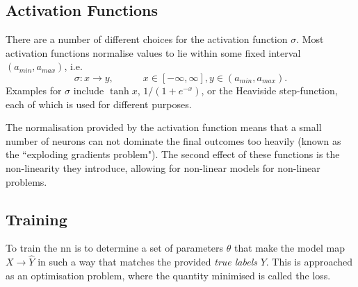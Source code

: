         
        \subsection{Activation Functions \label{ssec: activation function}}
    
        There are a number of different choices for the activation function $\sigma$. Most activation functions normalise values to lie within some fixed interval $(a_{min}, a_{max})$, i.e.
        \begin{equation}
        \sigma : x \rightarrow y, \hspace{3em} x \in [-\infty, \infty], y \in (a_{min}, a_{max}).
        \end{equation}
        Examples for $\sigma$ include $\tanh{x}$, $1/(1 + e^{-x})$, or the Heaviside step-function, each of which is used for different purposes.
        
        The normalisation provided by the activation function means that a small number of \glspl{neuron} can not dominate the final outcomes too heavily (known as the ``exploding gradients problem"). The second effect of these functions is the non-linearity they introduce, allowing for non-linear models for non-linear problems\cite{mlTextbook}.
        
    \subsection{Training \label{ssec: training}}
        To train the \gls{nn} is to determine a set of parameters $\theta$ that make the \gls{model} map $X \rightarrow \hat{Y}$ in such a way that matches the provided \textit{true labels} $Y$. This is approached as an optimisation problem, where the quantity minimised is called the loss\cite{mlTextbook}.
        
